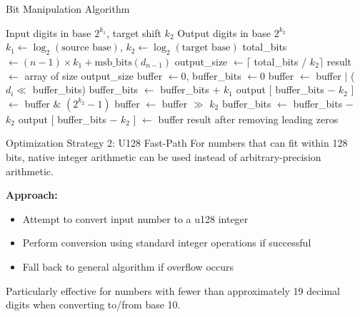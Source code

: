 \documentclass[10pt]{beamer}
\begin{document}
\begin{frame}[fragile]{Bit Manipulation Algorithm}
\begin{algorithm}[H]
\caption{Bit Manipulation Base Conversion}
\begin{algorithmic}[1]
\scriptsize
\REQUIRE Input digits in base $2^{k_1}$, target shift $k_2$ \ENSURE Output digits in base $2^{k_2}$ \STATE $k_1 \gets \log_2(\text{source base})$, $k_2 \gets \log_2(\text{target base})$ \STATE total\_bits $\gets (n-1) \times k_1 + \text{msb\_bits}(d_{n-1})$ \STATE output\_size $\gets \lceil$ total\_bits / $k_2 \rceil$ \STATE result $\gets$ array of size output\_size
\STATE buffer $\gets 0$, buffer\_bits $\gets 0$ 
  \STATE buffer $\gets$ buffer $|$ ($d_i \ll$ buffer\_bits)
  \STATE buffer\_bits $\gets$ buffer\_bits $+$ $k_1$   
    \STATE output $[$ buffer\_bits $-$ $k_2$ $]$ $\gets$ buffer $\&$ $(2^{k_2} - 1)$     \STATE buffer $\gets$ buffer $\gg$ $k_2$     \STATE buffer\_bits $\gets$ buffer\_bits $-$ $k_2$   \ENDWHILE
\ENDFOR
{}
  \STATE output $[$ buffer\_bits $-$ $k_2$ $]$ $\gets$ buffer
\ENDIF
\RETURN result after removing leading zeros
\end{algorithmic}
\end{algorithm}
\end{frame}

\begin{frame}{Optimization Strategy 2: U128 Fast-Path}
For numbers that can fit within 128 bits, native integer arithmetic can be used instead of arbitrary-precision arithmetic.

\vspace{0.3cm}
\textbf{Approach:}
\begin{itemize}
\item Attempt to convert input number to a u128 integer
\item Perform conversion using standard integer operations if successful
\item Fall back to general algorithm if overflow occurs
\end{itemize}

\vspace{0.3cm}
Particularly effective for numbers with fewer than approximately 19 decimal digits when converting to/from base 10.
\end{frame}
\end{document}
